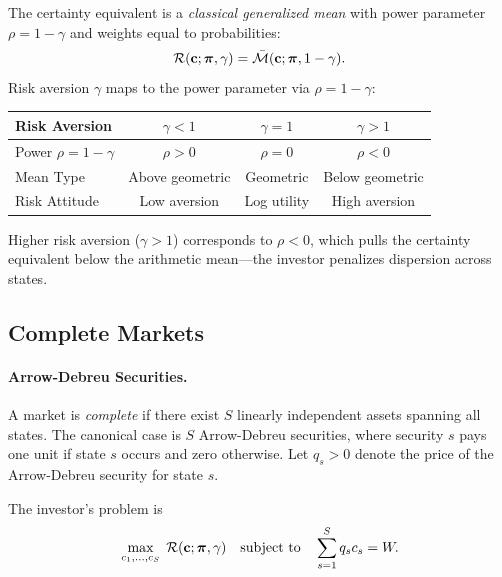The certainty equivalent is a \emph{classical generalized mean} with power parameter $\rho = 1 - \gamma$ and weights equal to probabilities:
\begin{equation}
\mathcal{R}(\mathbf{c}; \bm{\pi}, \gamma) = \bar{\mathcal{M}}(\mathbf{c}; \bm{\pi}, 1-\gamma).
\label{eq:ce-as-mean}
\end{equation}
Risk aversion $\gamma$ maps to the power parameter via $\rho = 1 - \gamma$:
\begin{center}
\begin{tabular}{@{}lccc@{}}
\toprule
Risk Aversion & $\gamma < 1$ & $\gamma = 1$ & $\gamma > 1$ \\
\midrule
Power $\rho = 1-\gamma$ & $\rho > 0$ & $\rho = 0$ & $\rho < 0$ \\
Mean Type & Above geometric & Geometric & Below geometric \\
Risk Attitude & Low aversion & Log utility & High aversion \\
\bottomrule
\end{tabular}
\end{center}

Higher risk aversion ($\gamma > 1$) corresponds to $\rho < 0$, which pulls the certainty equivalent below the arithmetic mean---the investor penalizes dispersion across states.

\subsection{Complete Markets}
\label{subsec:complete-markets}

\paragraph{Arrow-Debreu Securities.}

A market is \emph{complete} if there exist $S$ linearly independent assets spanning all states. The canonical case is $S$ Arrow-Debreu securities, where security $s$ pays one unit if state $s$ occurs and zero otherwise. Let $q_s > 0$ denote the price of the Arrow-Debreu security for state $s$.

The investor's problem is
\begin{equation}
\max_{c_1, \ldots, c_S} \; \mathcal{R}(\mathbf{c}; \bm{\pi}, \gamma) \quad \text{subject to} \quad \sum_{s=1}^{S} q_s c_s = W.
\label{eq:complete-markets-problem}
\end{equation}

